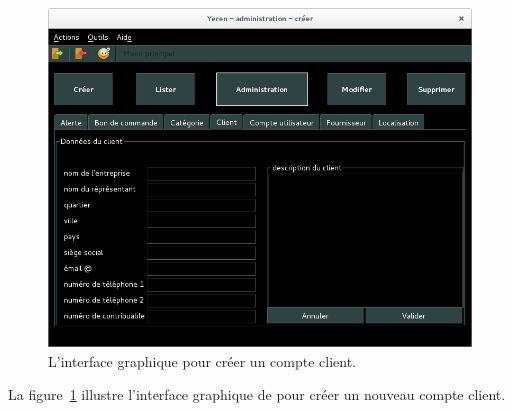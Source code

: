 
\newpage
{}\label{sec:administration-comptes-clients-lister}

\begin{figure}[!htpb]
	\centering
	\includegraphics[scale=0.45]{images/compte-client-creer.png}
	\caption{L'interface graphique pour cr\'eer un compte client.}
	\label{fig:admin-comptes-clients-creer}
\end{figure}

La figure~\ref{fig:admin-comptes-clients-creer} illustre
l'interface graphique de \yeroth pour cr\'eer un nouveau
compte client.

